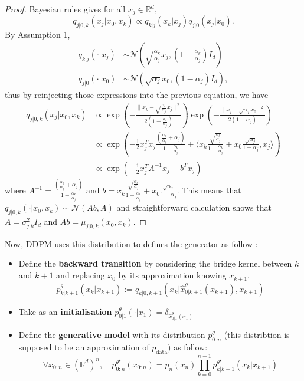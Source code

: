 \documentclass[12pt]{article}
\begin{document}
\begin{proof}
    Bayesian rules gives for all $x_j \in \mathbb{R}^d$,
    $$q_{j|0,k}(x_j | x_0, x_k) \propto q_{k|j}(x_k | x_j) q_{j|0}(x_j | x_0).$$
    By Assumption 1, 
    \begin{align*}
    q_{k|j}(\cdot | x_j) &\sim \mathcal{N}\left( \sqrt{\frac{\alpha_k}{\alpha_j}} x_j, (1 - \frac{\alpha_k}{\alpha_j}) I_d \right) \\
    q_{j|0}(\cdot | x_0) &\sim \mathcal{N}\left( \sqrt{\alpha_j} x_0, (1 - \alpha_j) I_d \right),
    \end{align*}
    thus by reinjecting those expressions into the previous equation, we have
    \begin{align*}
        q_{j|0,k}(x_j | x_0, x_k) 
        & \propto \exp\left( -\frac{\| x_k - \sqrt{\frac{\alpha_k}{\alpha_j}} x_j \|^2}{2(1 - \frac{\alpha_k}{\alpha_j})} \right)
        \exp\left( -\frac{\| x_j - \sqrt{\alpha_j} x_0 \|^2}{2(1 - \alpha_j)} \right) \\
        & \propto \exp\left( -\frac{1}{2}x_j^Tx_j\frac{(\frac{\alpha_k}{\alpha_j} + \alpha_j)}{1-\frac{\alpha_k}{\alpha_j}} 
        + \langle x_k \frac{\sqrt{\frac{\alpha_k}{\alpha_j}}}{1- \frac{\alpha_k}{\alpha_j}} 
        + x_0 \frac{\sqrt{\alpha_j}}{1-\alpha_j}, x_j \rangle \right) \\
        & \propto \exp\left( -\frac{1}{2}x_j^T A^{-1} x_j + b^Tx_j \right)
    \end{align*}
    where $A^{-1} = \frac{(\frac{\alpha_k}{\alpha_j} + \alpha_j)}{1-\frac{\alpha_k}{\alpha_j}}$ and 
    $b = x_k \frac{\sqrt{\frac{\alpha_k}{\alpha_j}}}{1- \frac{\alpha_k}{\alpha_j}} 
        + x_0 \frac{\sqrt{\alpha_j}}{1-\alpha_j}$.
    This means that $q_{j|0,k}(\cdot | x_0, x_k) \sim \mathcal{N}(Ab, A)$ and straightforward calculation shows 
    that $A = \sigma^2_{j|k} I_d$ and $Ab = \mu_{j|0,k}(x_0, x_k)$.
\end{proof}

Now, DDPM uses this distribution to defines the generator as follow :
\begin{itemize}
\item Define the \textbf{backward transition} by considering 
the bridge kernel between $k$ and $k+1$ and replacing $x_0$ by its approximation knowing $x_{k+1}$.
$$p^{\theta}_{k|k+1}(x_k | x_{k+1}) 
:= q_{k|0,k+1}(x_k | \hat{x}^{\theta}_{0|k+1}(x_{k+1}), x_{k+1})$$
\item Take as an \textbf{initialisation} $p^{\theta}_{0|1}(\cdot | x_{1}) = \delta_{\hat{x}^{\theta}_{0|1}(x_1)}$
\item Define the \textbf{generative model} with its distribution $p^\theta_{0:n}$ (this distribtion is 
supposed to be an approximation 
of $p_{\text{data}})$ as follow:
$$\forall x_{0:n} \in (\mathbb{R}^d)^n, \quad p^{\theta^{\star}}_{0:n}(x_{0:n}) = p_n(x_n) \prod_{k=0}^{n-1} p^{\theta^{\star}}_{k|k+1}(x_k | x_{k+1})$$
\end{itemize}
\end{document}
